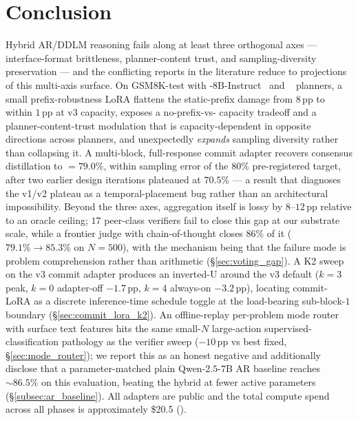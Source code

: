 \section{Conclusion}
\label{sec:conclusion}

Hybrid AR/DDLM reasoning fails along at least three orthogonal
axes --- interface-format brittleness, planner-content trust, and
sampling-diversity preservation --- and the conflicting reports in
the literature reduce to projections of this multi-axis surface.
On GSM8K-test with \LLaDA{}-8B-Instruct~\citep{nie2025llada} and
~\citep{qwen2024report} planners, a small
prefix-robustness LoRA flattens the static-prefix damage from
$8$\,pp to within $1$\,pp at v3 capacity, exposes a
no-prefix-vs-\cmaj{} capacity tradeoff and a planner-content-trust
modulation that is capacity-dependent in opposite directions
across planners, and unexpectedly \emph{expands} sampling
diversity rather than collapsing it.  A multi-block,
full-response commit adapter recovers consensus distillation to
\ctwoc{} $= 79.0\%$, within sampling error of the $80\%$
pre-registered target, after two earlier design iterations
plateaued at $70.5\%$ --- a result that diagnoses the v1/v2
plateau as a temporal-placement bug rather than an architectural
impossibility.  Beyond the three axes, \cmaj{} aggregation itself
is lossy by $8\text{--}12$\,pp relative to an oracle ceiling; $17$
peer-class verifiers fail to close this gap at our substrate
scale, while a frontier judge with chain-of-thought closes
$86\%$ of it ($79.1\% \to 85.3\%$ on $N{=}500$), with the
mechanism being that the failure mode is problem comprehension
rather than arithmetic (\S\ref{sec:voting_gap}).
A K2  sweep on the v3 commit adapter
produces an inverted-U around the v3 default ($k{=}3$ peak,
$k{=}0$ adapter-off $-1.7$\,pp, $k{=}4$ always-on $-3.2$\,pp),
locating commit-LoRA as a discrete inference-time schedule toggle
at the load-bearing sub-block-$1$ boundary
(\S\ref{sec:commit_lora_k2}).  An offline-replay per-problem mode
router with surface text features hits the same small-$N$
large-action supervised-classification pathology as the verifier
sweep ($-10$\,pp vs best fixed,
\S\ref{sec:mode_router}); we report this as an honest negative
and additionally disclose that a parameter-matched plain
Qwen-$2.5$-$7$B AR baseline reaches $\sim 86.5\%$ on this
evaluation, beating the hybrid at fewer active parameters
(\S\ref{subsec:ar_baseline}).
All adapters are public and the total compute spend across all
phases is approximately \$20.5 ().
